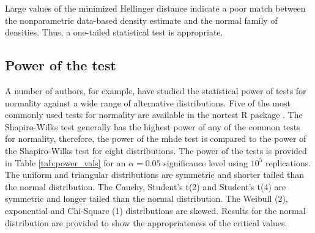 \documentclass{article}
\begin{document}
Large values of the minimized Hellinger distance indicate a poor match between the nonparametric data-based density estimate and the normal family of densities.  Thus, a one-tailed statistical test is appropriate.

\subsection{Power of the test}

A number of authors, \parencite{razali2011} for example, have studied the statistical power of tests for normality against a wide range of alternative distributions.  Five of the most commonly used tests for normality are available in the nortest R package \parencite{gross2015}.  The Shapiro-Wilks test \parencite{shapiro1965} generally has the highest power of any of the common tests for normality, therefore, the power of the mhde test is compared to the power of the Shapiro-Wilks test for eight distributions.  The power of the tests is provided in Table \ref{tab:power_vals} for an $\alpha=0.05$ significance level using  $10^5$ replications.  The uniform and triangular distributions are symmetric and shorter tailed than the normal distribution.  The Cauchy, Student's t(2) and Student's t(4) are symmetric and longer tailed than the normal distribution.  The Weibull (2), exponential and Chi-Square (1) distributions are skewed.  Results for the normal distribution are provided to show the appropriateness of the critical values.
\end{document}
